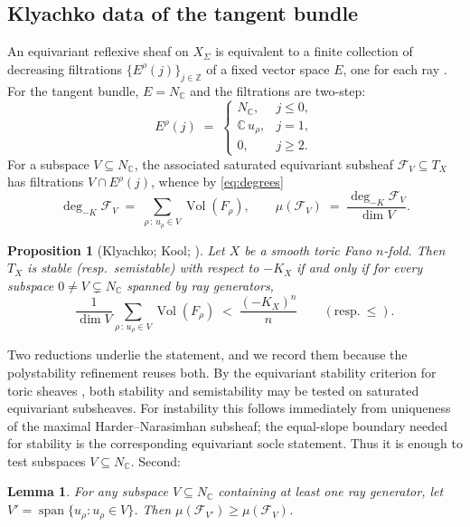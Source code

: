 \documentclass[11pt]{amsart}
\newtheorem{proposition}[theorem]{Proposition}
\newtheorem{lemma}[theorem]{Lemma}
\theoremstyle{definition}
\theoremstyle{remark}
\newcommand{\CC}{\mathbb{C}}
\newcommand{\ZZ}{\mathbb{Z}}
\newcommand{\Vol}{\operatorname{Vol}}
\begin{document}
\subsection{Klyachko data of the tangent bundle}
An equivariant reflexive sheaf on $X_\Sigma$ is equivalent to a finite
collection of decreasing filtrations $\{E^\rho(j)\}_{j \in \ZZ}$ of a
fixed vector space $E$, one for each ray
\cite{Klyachko1990,Perling2004,Kool2011}. For the tangent bundle,
$E = N_\CC$ and the filtrations are two-step:
\[
E^\rho(j) \;=\;
\begin{cases}
N_\CC, & j \le 0,\\
\CC\, u_\rho, & j = 1,\\
0, & j \ge 2.
\end{cases}
\]
For a subspace $V \subseteq N_\CC$, the associated saturated equivariant
subsheaf $\mathcal{F}_V \subseteq T_X$ has filtrations
$V \cap E^\rho(j)$, whence by \eqref{eq:degrees}
\begin{equation}\label{eq:subsheafdeg}
\deg_{-K} \mathcal{F}_V \;=\; \sum_{\rho\,:\,u_\rho \in V}
\Vol(F_\rho),
\qquad
\mu(\mathcal{F}_V) \;=\; \frac{\deg_{-K}\mathcal{F}_V}{\dim V}.
\end{equation}

\begin{proposition}[{Klyachko; Kool; \cite[Prop.~1.2]{HNS2022}}]
\label{prop:criterion}
Let $X$ be a smooth toric Fano $n$-fold. Then $T_X$ is stable
(resp.\ semistable) with respect to $-K_X$ if and only if for every
subspace $0 \ne V \subsetneq N_\CC$ spanned by ray generators,
\[
\frac{1}{\dim V}\sum_{\rho\,:\,u_\rho \in V} \Vol(F_\rho)
\;<\; \frac{(-K_X)^n}{n}
\qquad (\text{resp.}\ \le).
\]
\end{proposition}

Two reductions underlie the statement, and we record them because the
polystability refinement reuses both. By the equivariant stability criterion
for toric sheaves \cite{Kool2011,HNS2022}, both stability and semistability may
be tested on saturated equivariant subsheaves. For instability this follows
immediately from uniqueness of the maximal Harder--Narasimhan subsheaf; the
equal-slope boundary needed for stability is the corresponding equivariant
socle statement. Thus it is enough to test subspaces
$V \subseteq N_\CC$. Second:

\begin{lemma}\label{lem:span}
For any subspace $V \subseteq N_\CC$ containing at least one ray
generator, let
$V' = \operatorname{span}\{u_\rho : u_\rho \in V\}$. Then
$\mu(\mathcal{F}_{V'}) \ge \mu(\mathcal{F}_V)$.
\end{lemma}
\end{document}

